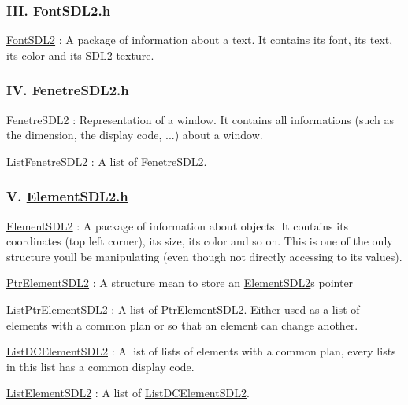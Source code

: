 \subsubsection*{I\+II. \hyperlink{FontSDL2_8h}{Font\+S\+D\+L2.\+h}}


\begin{DoxyEnumerate}
\item \hyperlink{structFontSDL2}{Font\+S\+D\+L2} \+: A package of information about a text. It contains its font, its text, its color and its S\+D\+L2 texture.
\end{DoxyEnumerate}

\subsubsection*{IV. Fenetre\+S\+D\+L2.\+h}


\begin{DoxyEnumerate}
\item Fenetre\+S\+D\+L2 \+: Representation of a window. It contains all informations (such as the dimension, the display code, ...) about a window.
\item List\+Fenetre\+S\+D\+L2 \+: A list of Fenetre\+S\+D\+L2.
\end{DoxyEnumerate}

\subsubsection*{V. \hyperlink{ElementSDL2_8h}{Element\+S\+D\+L2.\+h}}


\begin{DoxyEnumerate}
\item \hyperlink{structElementSDL2}{Element\+S\+D\+L2} \+: A package of information about objects. It contains its coordinates (top left corner), its size, its color and so on. This is one of the only structure you\textquotesingle{}ll be manipulating (even though not directly accessing to its values).
\item \hyperlink{structPtrElementSDL2}{Ptr\+Element\+S\+D\+L2} \+: A structure mean to store an \hyperlink{structElementSDL2}{Element\+S\+D\+L2}\textquotesingle{}s pointer
\item \hyperlink{structListPtrElementSDL2}{List\+Ptr\+Element\+S\+D\+L2} \+: A list of \hyperlink{structPtrElementSDL2}{Ptr\+Element\+S\+D\+L2}. Either used as a list of elements with a common plan or so that an element can change another.
\item \hyperlink{structListDCElementSDL2}{List\+D\+C\+Element\+S\+D\+L2} \+: A list of lists of elements with a common plan, every lists in this list has a common display code.
\item \hyperlink{structListElementSDL2}{List\+Element\+S\+D\+L2} \+: A list of \hyperlink{structListDCElementSDL2}{List\+D\+C\+Element\+S\+D\+L2}.
\end{DoxyEnumerate}

